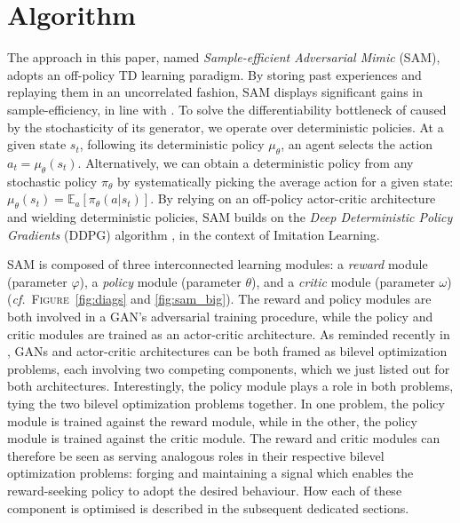 \section{Algorithm}

The approach in this paper,
named \emph{Sample-efficient Adversarial Mimic} (SAM),
adopts an off-policy TD learning paradigm.
By storing past experiences and replaying them in an uncorrelated fashion,
SAM displays significant gains in sample-efficiency,
in line with \cite{Wang2016-mp, Gu2016-uc}.
To solve the differentiability bottleneck of \cite{Ho2016-bv}
caused by the stochasticity of its generator,
we operate over deterministic policies.
At a given state $s_t$, following its deterministic policy $\mu_\theta$,
an agent selects the action $a_t = \mu_\theta(s_t)$.
Alternatively, we can obtain a deterministic policy from any stochastic policy
$\pi_\theta$
by systematically picking the average action for a given state:
$\mu_\theta(s_t) = \mathbb{E}_a[\pi_\theta(a | s_t)]$.
By relying on an off-policy actor-critic architecture and
wielding deterministic policies,
SAM builds on
the \textit{Deep Deterministic Policy Gradients} (DDPG) algorithm
\cite{Lillicrap2016-xa},
in the context of Imitation Learning.

SAM is composed of three interconnected learning modules:
a \emph{reward} module (parameter $\varphi$),
a \emph{policy} module (parameter $\theta$), and
a \emph{critic} module (parameter $\omega$)
(\textit{cf.}~\textsc{Figure}~\ref{fig:diags} and \ref{fig:sam_big}).
The reward and policy modules are both involved in a GAN's adversarial
training procedure,
while the policy and critic modules are trained as an
actor-critic architecture.
As reminded recently in \cite{Pfau2016-ft}, GANs and actor-critic
architectures can be both framed as bilevel optimization problems, each
involving two competing components, which we just listed out for both
architectures.
Interestingly, the policy module plays a role in both problems,
tying the two bilevel optimization problems together.
In one problem, the policy module is trained against the reward module,
while in the other,
the policy module is trained against the critic module.
The reward and critic modules can therefore be seen as serving analogous roles
in their respective bilevel optimization problems:
forging and maintaining a signal which enables the reward-seeking policy to
adopt the desired behaviour.
How each of these component is optimised is described in the
subsequent dedicated sections.

